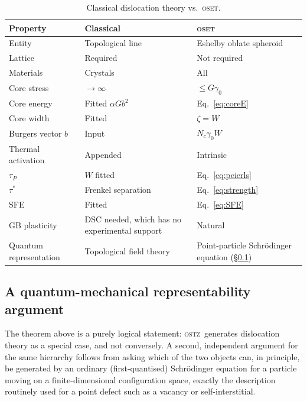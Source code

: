 \documentclass[3p]{elsarticle}
\newcommand{\OSTZ}{\textsc{ostz}}
\newcommand{\OSET}{\textsc{oset}}
\newcommand{\gz}{\gamma_0}
\begin{document}
\begin{table}[htbp]
\centering
\small
\caption{Classical dislocation theory vs.\ \OSET.}
\label{tab:comparison}
\renewcommand{\arraystretch}{1.35}
\begin{tabular}{p{2.5cm}p{3.8cm}p{4.5cm}}
\toprule
Property & Classical & \OSET\\
\midrule
Entity & Topological line & Eshelby oblate spheroid\\
Lattice & Required & Not required\\
Materials & Crystals & All\\
Core stress & $\to\infty$ & $\le G\gz$\\
Core energy & Fitted $\alpha Gb^2$ & Eq.~\eqref{eq:coreE}\\
Core width & Fitted & $\zeta=W$\\
Burgers vector $b$ & Input & $N_c\gz W$\\
Thermal activation & Appended & Intrinsic\\
$\tau_P$ & $W$ fitted & Eq.~\eqref{eq:peierls}\\
$\tau^*$ & Frenkel separation & Eq.~\eqref{eq:strength}\\
SFE & Fitted & Eq.~\eqref{eq:SFE}\\
GB plasticity & DSC needed, which has no experimental support & Natural\\
Quantum representation & Topological field theory & Point-particle Schr\"odinger equation (\S\ref{sec:quantum})\\
\bottomrule
\end{tabular}
\renewcommand{\arraystretch}{1}
\end{table}

\subsection{A quantum-mechanical representability argument}
\label{sec:quantum}

The theorem above is a purely logical statement: \OSTZ\ generates
dislocation theory as a special case, and not conversely. A second,
independent argument for the same hierarchy follows from asking
which of the two objects can, in principle, be generated by an
ordinary (first-quantised) Schr\"odinger equation for a particle
moving on a finite-dimensional configuration space, exactly the
description routinely used for a point defect such as a vacancy or
self-interstitial.
\end{document}
